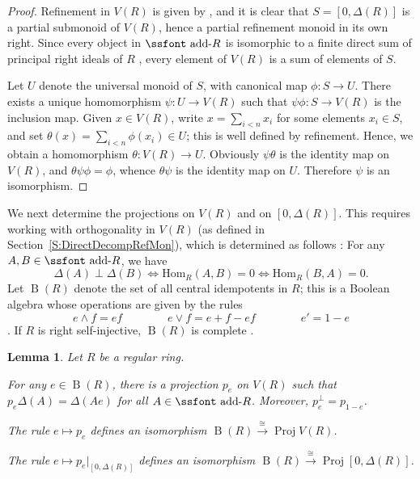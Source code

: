 \documentclass[psamsfonts,reqno]{memo-l}
\theoremstyle{plain}
\newtheorem{lemma}{Lemma}[section]
\theoremstyle{definition}
\theoremstyle{remark}
\numberwithin{equation}{section}
\DeclareMathOperator{\rB}{B}
\DeclareMathOperator{\BB}{Proj}
\newcommand{\addR}{\mbox{\ssfont add-}R}
\newcommand{\Hom}{\mathrm{Hom}}
\begin{document}
\begin{proof} Refinement in $V(R)$ is given by
\cite[Theorem~2.8]{GvnRR}, and it is clear that
$S=[0,\Delta(R)]$ is a partial submonoid of $V(R)$,
hence a partial refinement monoid in
its own right. Since every object in
$\addR$ is isomorphic to a finite direct sum of principal right ideals of
$R$ \cite[Proposition~2.6]{GvnRR}, every element
of $V(R)$ is a sum of elements of $S$.

Let $U$ denote the universal monoid of $S$, with canonical map
$\phi\colon S\rightarrow U$. There exists a unique homomorphism
$\psi\colon U\rightarrow V(R)$ such that
$\psi\phi\colon S\rightarrow V(R)$ is the inclusion map.
Given $x\in V(R)$, write
$x= \sum_{i<n} x_i$ for some elements $x_i\in S$, and set $\theta(x)=
\sum_{i<n}
\phi(x_i)\in U$; this is well defined by refinement. Hence, we
obtain a homomorphism $\theta\colon V(R)\rightarrow U$. Obviously
$\psi\theta$ is the identity map on $V(R)$, and
$\theta\psi\phi=\phi$, whence $\theta\psi$ is the identity map on $U$.
Therefore $\psi$ is an isomorphism.
\end{proof}

We next determine the projections on $V(R)$ and on
$[0,\Delta(R)]$. This requires working with orthogonality in
$V(R)$ (as defined in
Section~\ref{S:DirectDecompRefMon}), which is determined as follows
\cite[Proposition~2.21]{GvnRR}: For any
$A,B\in \addR$, we have
   \[
   \Delta(A)\perp\Delta(B) \Longleftrightarrow \Hom_R(A,B)=0
   \Longleftrightarrow \Hom_R(B,A)=0.
   \]
Let $\rB(R)$\index{BrzzB@$\rB(R)$|ii}
denote the set of all central idempotents in $R$; this
is a Boolean algebra 
whose operations are given by the rules
   \[
   e\wedge f = ef \qquad\qquad e\vee f = e+f-ef \qquad\qquad e' = 1-e
   \]
\cite[p.~83]{GvnRR}. If $R$ is right self-injective,
$\rB(R)$ is complete \cite[Proposition~9.9]{GvnRR}.

\begin{lemma}\label{L:B(R)}
Let $R$ be a regular ring.
\enumerate
\item For any $e\in \rB(R)$, there is a projection $p_e$ on
$V(R)$ such that $p_e\Delta(A)= \Delta(Ae)$ for all
$A\in \addR$. Moreover,
$p_e^\perp= p_{1-e}$.
\item The rule $e\mapsto p_e$ defines an isomorphism\index{pzzroj@$\BB{S}$}
$\rB(R)\overset{\cong}\longrightarrow \BB V(R)$.
\item The rule $e\mapsto p_e|_{[0,\Delta(R)]}$ defines an
\index{pzzroj@$\BB{S}$}
isomorphism $\rB(R) \overset{\cong}\longrightarrow \BB[0,\Delta(R)]$.
\end{lemma}
\end{document}
